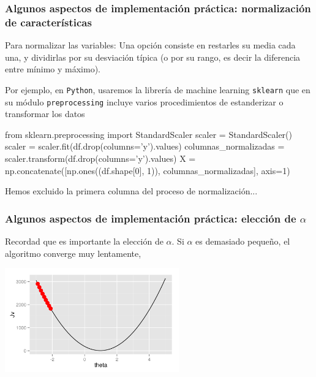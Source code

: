 \documentclass[aspectratio=169]{beamer}
\begin{document}
\begin{frame}[fragile]\frametitle{Algunos aspectos de implementación práctica: normalización de características}
\begin{block}{Para normalizar las variables:}
Una opción consiste en restarles su media cada una, y dividirlas por su desviación típica (o por su rango, es decir la diferencia entre mínimo y máximo).
\end{block}
Por ejemplo, en {\tt Python}, usaremos la librería de machine learning
{\tt sklearn} que en su módulo {\tt preprocessing} incluye varios
procedimientos de estanderizar o transformar los datos
{\scriptsize
\begin{pyconsole}
from sklearn.preprocessing import StandardScaler
scaler = StandardScaler()
scaler = scaler.fit(df.drop(columns='y').values)
columnas_normalizadas = scaler.transform(df.drop(columns='y').values)
X = np.concatenate([np.ones((df.shape[0], 1)), columnas_normalizadas], axis=1)
\end{pyconsole}
}
 Hemos excluido la primera columna del proceso de normalización...
\end{frame}
\begin{frame}\frametitle{Algunos aspectos de implementación práctica: elección de $\alpha$}
\begin{overlayarea}{\textwidth}{8cm}
Recordad que es importante la elección de $\alpha$. Si $\alpha$ es demasiado pequeño, el algoritmo converge muy lentamente,
\begin{center}
\includegraphics[height=4.5cm]{gradientdescent-smallalpha-1-9.png}
\end{center}
\end{overlayarea}
\end{frame}
\end{document}
